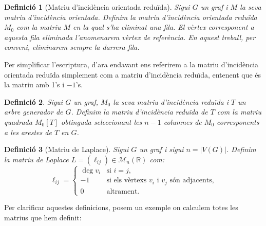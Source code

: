 \documentclass{article}
\newtheorem{definition}{Definició}[section]
\begin{document}
    \begin{definition}[Matriu d'incidència orientada reduïda]
    Sigui $G$ un graf i $M$ la seva matriu d'incidència orientada. Definim la matriu d'incidència orientada reduïda $M_0$ com la matriu $M$ en la qual s'ha eliminat una fila. El vèrtex corresponent a aquesta fila eliminada l'anomenarem vèrtex de referència. En aquest treball, per conveni, eliminarem sempre la darrera fila. \cite{2}
    \end{definition}
    Per simplificar l'escriptura, d'ara endavant ens referirem a la matriu d'incidència orientada reduïda simplement com a matriu d'incidència reduïda, entenent que és la matriu amb 1's i $-1$'s.
    \begin{definition}
    Sigui $G$ un graf, $M_0$ la seva matriu d'incidència reduïda i $T$ un arbre generador de $G$. Definim la matriu d'incidència reduïda de $T$ com la matriu quadrada $M_0[T]$ obtinguda seleccionant les $n-1$ columnes de $M_0$ corresponents a les arestes de $T$ en $G$. \cite{2}
    \end{definition}
    \begin{definition}[Matriu de Laplace]
        Sigui $G$ un graf i sigui $n=|V(G)|$. Definim la matriu de Laplace $L=(\ell_{ij})\in\mathcal{M}_n(\mathbb{R})$ com:
        $$\ell_{ij}=\left\{\begin{array}{cl}
            \deg v_i & \text{si $i=j$,}\\
            -1 & \text{si els vèrtexs $v_i$ i $v_j$ són adjacents,}\\
            0 & \text{altrament.}
        \end{array}\right.$$\cite{9}
    \end{definition}
    Per clarificar aquestes definicions, posem un exemple on calculem totes les matrius que hem definit:
\end{document}
